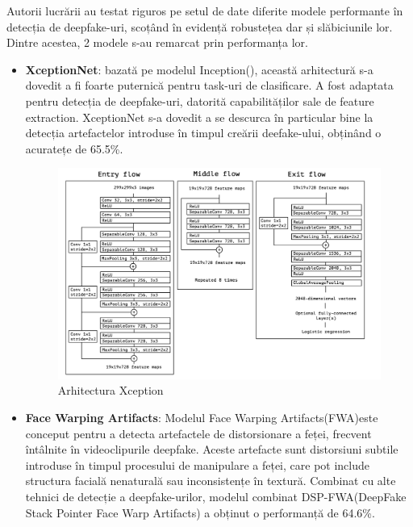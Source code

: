 Autorii lucrării au testat riguros pe setul de date diferite modele performante în detecția de deepfake-uri, scoțând în evidență robustețea dar și slăbiciunile lor. Dintre acestea, 2 modele s-au remarcat prin performanța lor.

\begin{itemize}
    \item \textbf{XceptionNet}\cite{rössler2019faceforensics}\cite{Chollet_2017_CVPR}: bazată pe modelul Inception(\cite{szegedy2015going}), această arhitectură s-a dovedit a fi foarte puternică pentru task-uri de clasificare. A fost adaptata pentru detecția de deepfake-uri, datorită capabilităților sale de feature extraction. XceptionNet s-a dovedit a se descurca în particular bine la detecția artefactelor introduse în timpul creării deefake-ului, obținând o acuratețe de 65.5\%.

    \newpage
    \begin{figure}[h]
         \centering 
         \includegraphics[width=0.85\linewidth]{images/xception-architecture.png}
         \captionsetup{font=footnotesize}
         \caption{Arhitectura Xception \cite{Chollet_2017_CVPR}}
    \end{figure}
    
    \item \textbf{Face Warping Artifacts}\cite{zhou2018twostream}: Modelul Face Warping Artifacts(FWA)este conceput pentru a detecta artefactele de distorsionare a feței, frecvent întâlnite în videoclipurile deepfake. Aceste artefacte sunt distorsiuni subtile introduse în timpul procesului de manipulare a feței, care pot include structura facială nenaturală sau inconsistențe în textură. Combinat cu alte tehnici de detecție a deepfake-urilor, modelul combinat DSP-FWA(DeepFake Stack Pointer Face Warp Artifacts) a obținut o performanță de 64.6\%.
\end{itemize}

